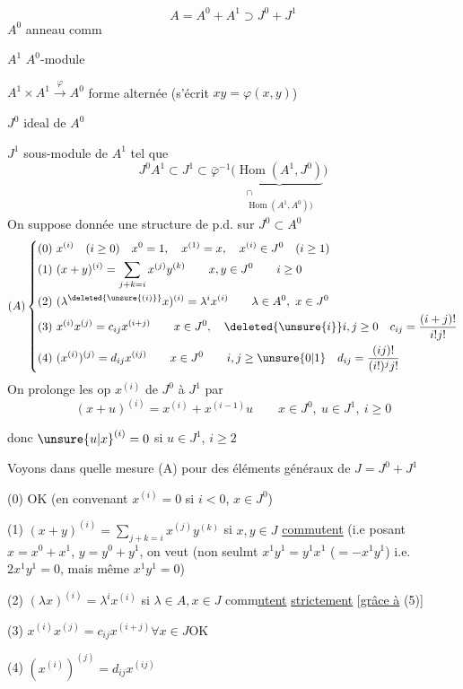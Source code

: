 \[
A=A^0+A^1\supset J^0+J^1
\]
$A^0$ anneau comm

$A^1$ \quad $A^0$-module

$A^1\times A^1\xrightarrow{\varphi}A^0$ forme alternée (s'écrit $xy=\varphi(x,y)$)

$J^0$ ideal de $A^0$

$J^1$  sous-module de $A^1$ tel que
\[
J^0 A^1\subset J^1\subset\bar\varphi^{-1}\bigl(\underset{\substack{\cap\\\operatorname{Hom}(A^1,A^0))}}{\underbrace{\operatorname{Hom}(A^1,J^0)}}\bigr)
\]
On suppose donnée une structure de p.d. sur $J^0\subset A^0$
\[
(A)\left\{\begin{aligned}
(0)\ &x^{(i)}\quad(i\geq0)\quad x^0=1,\quad x^{(1)}=x,\quad x^{(i)}\in J^0\quad(i\geq1)\\
(1)\ &(x+y)^{(i)}=\sum_{j+k=i}x^{(j)}y^{(k)}\qquad x,y\in J^0\qquad i\geq0\\
(2)\ &(\lambda^{\deleted{\unsure{(i)}}}x)^{(i)}=\lambda^i x^{(i)}\qquad\lambda\in A^0,\ x\in J^0\\
(3)\ &x^{(i)}x^{(j)}=c_{ij}x^{(i+j)}\qquad x\in J^0,\quad\deleted{\unsure{i}}i,j\geq0\quad c_{ij}=\frac{(i+j)!}{i!j!}\\
(4)\ &(x^{(i)})^{(j)}=d_{ij}x^{(ij)}\qquad x\in J^0\qquad i,j\geq\unsure{0|1}\quad d_{ij}=\frac{(ij)!}{(i!)^j j!}
\end{aligned}\right.
\]
On prolonge les op $x^{(i)}$ de $J^0$ à  $J^1$ par
\[
(x+u)^{(i)}=x^{(i)}+x^{(i-1)}u\qquad x\in J^0,\ u\in J^1,\ i\geq0\tag*{($\ast$)}
\]

donc $\unsure{u|x}^{(i)}=0$ si $u\in J^1$, $i\geq2$

Voyons dans quelle mesure (A)  pour des éléments généraux de $J=J^0+J^1$

(0) OK (en convenant $x^{(i)}=0$ si $i<0$, $x\in J^0$) 

(1) $\displaystyle(x+y)^{(i)}=\sum_{j+k=i}x^{(j)}y^{(k)}$ si $x,y\in J$ \uline{commutent} 
 (i.e posant $x=x^0+x^1$, $y=y^0+y^1$, on veut (non seulmt $x^1y^1=y^1x^1$  ($=-x^1y^1$) i.e. $2x^1y^1=0$, mais même $x^1y^1=0$)

(2) $(\lambda x)^{(i)}=\lambda^i x^{(i)}$ si $\lambda\in A,x\in J$ comm\uline{utent} \uline{strictement} [\uline{grâce à} (5)]

(3)  $x^{(i)}x^{(j)}=c_{ij}x^{(i+j)}$\qquad $\forall x\in J$\quad OK

(4) $(x^{(i)})^{(j)}=d_{ij}x^{(ij)}$
